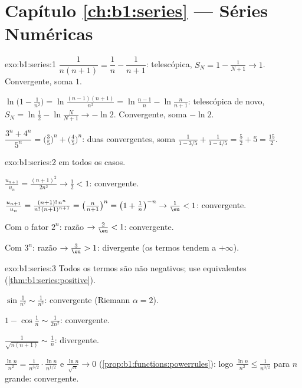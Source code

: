 \section*{Capítulo \ref{ch:b1:series} --- Séries Numéricas}

\begin{solution}{exo:b1:series:1}
$\dfrac{1}{n(n+1)} = \dfrac1n - \dfrac{1}{n+1}$: telescópica, $S_N =
1 - \frac{1}{N+1} \to 1$. Convergente, soma $1$.

$\ln\bigl(1 - \frac{1}{n^2}\bigr) = \ln\frac{(n-1)(n+1)}{n^2} =
\ln\frac{n-1}{n} - \ln\frac{n}{n+1}$: telescópica de novo, $S_N =
\ln\frac12 - \ln\frac{N}{N+1} \to -\ln 2$. Convergente, soma $-\ln 2$.

$\dfrac{3^n + 4^n}{5^n} = \bigl(\frac35\bigr)^n +
\bigl(\frac45\bigr)^n$: duas  convergentes, soma
$\frac{1}{1 - 3/5} + \frac{1}{1 - 4/5} = \frac52 + 5 = \frac{15}{2}$.
\end{solution}

\begin{solution}{exo:b1:series:2}
 em todos os casos.

$\frac{u_{n+1}}{u_n} = \frac{(n+1)^2}{2n^2} \to \frac12 < 1$:
convergente.

$\frac{u_{n+1}}{u_n} = \frac{(n+1)!\,n^n}{n!\,(n+1)^{n+1}} =
\bigl(\frac{n}{n+1}\bigr)^n = \bigl(1 + \frac1n\bigr)^{-n} \to
\frac1\eu < 1$: convergente.

Com o fator $2^n$: razão $\to \frac2\eu < 1$: convergente.

Com $3^n$: razão $\to \frac3\eu > 1$: divergente (os termos tendem a
$+\infty$).
\end{solution}

\begin{solution}{exo:b1:series:3}
Todos os termos são não negativos; use equivalentes
(\cref{thm:b1:series:positive}).

$\sin\frac{1}{n^2} \sim \frac{1}{n^2}$: convergente (Riemann $\alpha
= 2$).

$1 - \cos\frac1n \sim \frac{1}{2n^2}$: convergente.

$\frac{1}{\sqrt{n(n+1)}} \sim \frac1n$: divergente.

$\frac{\ln n}{n^2} = \frac{1}{n^{3/2}}\cdot\frac{\ln n}{n^{1/2}}$
e $\frac{\ln n}{\sqrt n} \to 0$
(\cref{prop:b1:functions:powerrules}): logo $\frac{\ln n}{n^2} \leq
\frac{1}{n^{3/2}}$ para $n$ grande: convergente.
\end{solution}

